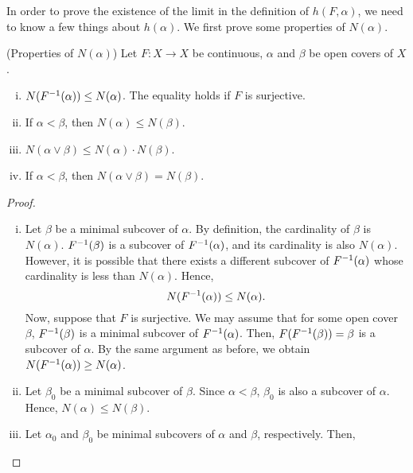 \documentclass[10pt,twoside,draft]{book}
\begin{document}
In order to prove the existence of the limit in the definition of $h(F, \alpha)$, we need to know a few things about $h(\alpha)$.
We first prove some properties of $N(\alpha)$.
\begin{proposition}
  (Properties of $N(\alpha)$)
  Let $F: X \to X$ be continuous, $\alpha$ and $\beta$ be open covers of $X$.
  \begin{enumerate}[(i)]
    \item 
      $N(F^{-1}(\alpha)) \leq N(\alpha)$.
      The equality holds if $F$ is surjective.
    \item 
      If $\alpha < \beta$, then $N(\alpha) \leq N(\beta)$.
    \item 
      $N(\alpha \vee \beta) \leq N(\alpha) \cdot N(\beta)$.
    \item 
      If $\alpha < \beta$, then $N(\alpha \vee \beta) = N(\beta)$.
  \end{enumerate}
  \begin{proof}
    \begin{enumerate}[(i)]
      \item 
        Let $\beta$ be a minimal subcover of $\alpha$.
        By definition, the cardinality of $\beta$ is $N(\alpha)$.
        $F^{-1}(\beta)$ is a subcover of $F^{-1}(\alpha)$, and its cardinality is also $N(\alpha)$.
        However, it is possible that there exists a different subcover of $F^{-1}(\alpha)$ whose cardinality is less than $N(\alpha)$.
        Hence, 
        \begin{equation*}
          N(F^{-1}(\alpha)) \leq N(\alpha).
        \end{equation*}
        Now, suppose that $F$ is surjective.
        We may assume that for some open cover $\beta$, $F^{-1}(\beta)$ is a minimal subcover of $F^{-1}(\alpha)$.
        Then, $F(F^{-1}(\beta)) = \beta$ is a subcover of $\alpha$.
        By the same argument as before, we obtain $N(F^{-1}(\alpha)) \geq N(\alpha)$.
      \item
        Let $\beta_0$ be a minimal subcover of $\beta$.
        Since $\alpha < \beta$, $\beta_0$ is also a subcover of $\alpha$.
        Hence, $N(\alpha) \leq N(\beta)$.
      \item
        Let $\alpha_0$ and $\beta_0$ be minimal subcovers of $\alpha$ and $\beta$, respectively.
        Then,
        \begin{equation*}

\end{equation*}
\end{enumerate}
\end{proof}
\end{proposition}
\end{document}
